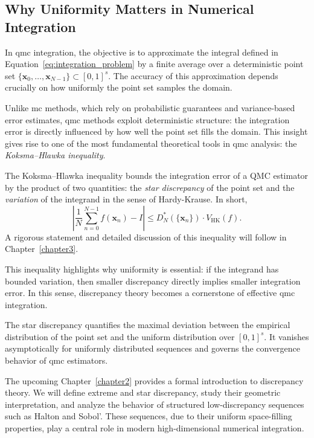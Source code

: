 \subsection{Why Uniformity Matters in Numerical Integration}

In \ac{qmc} integration, the objective is to approximate the integral defined in
Equation~\eqref{eq:integration_problem} by a finite average over a deterministic
point set $\{\boldsymbol{x}_0, \dots, \boldsymbol{x}_{N-1}\} \subset [0,1]^s$.
The accuracy of this approximation depends crucially on how uniformly the point
set samples the domain.

Unlike \ac{mc} methods, which rely on probabilistic guarantees and
variance-based error estimates, \ac{qmc} methods exploit deterministic
structure: the integration error is directly influenced by how well the point
set fills the domain. This insight gives rise to one of the most fundamental
theoretical tools in \ac{qmc} analysis: the \emph{Koksma--Hlawka inequality}.

\begin{remark}
The Koksma--Hlawka inequality bounds the integration error of a QMC estimator by
the product of two quantities: the \emph{star discrepancy} of the point set and
the \emph{variation} of the integrand in the sense of Hardy-Krause. In
short,
\begin{equation*}
    \left| \frac{1}{N} \sum_{n=0}^{N-1} f(\boldsymbol{x}_n) - I \right| 
    \leq D_N^*(\{\boldsymbol{x}_n\}) \cdot V_{\mathrm{HK}}(f).
\end{equation*}
A rigorous statement and detailed discussion of this inequality will follow in
Chapter~\ref{chapter3}.
\end{remark}

This inequality highlights why uniformity is essential: if the integrand has
bounded variation, then smaller discrepancy directly implies smaller integration
error. In this sense, discrepancy theory becomes a cornerstone of effective
\ac{qmc} integration.

\begin{remark}
The star discrepancy quantifies the maximal deviation between the empirical
distribution of the point set and the uniform distribution over $[0,1]^s$. It
vanishes asymptotically for uniformly distributed sequences and governs the
convergence behavior of \ac{qmc} estimators.
\end{remark}

The upcoming Chapter~\ref{chapter2} provides a formal introduction to
discrepancy theory. We will define extreme and star discrepancy, study their
geometric interpretation, and analyze the behavior of structured low-discrepancy
sequences such as Halton and Sobol'. These sequences, due to their uniform
space-filling properties, play a central role in modern high-dimensional
numerical integration.
